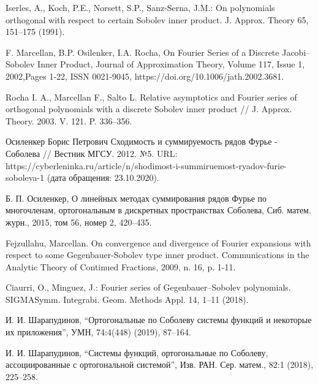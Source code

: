 \begin{thebibliography}{111}
	
	
	
	
	Iserles, A., Koch, P.E., Norsett, S.P., Sanz-Serna, J.M.: On polynomials orthogonal with respect to
	certain Sobolev inner product. J. Approx. Theory 65, 151–175 (1991).
	
	
	
	
	F. Marcellan, B.P. Osilenker, I.A. Rocha, On Fourier Series of a Discrete Jacobi–Sobolev Inner Product, Journal of Approximation Theory, Volume 117, Issue 1, 2002,Pages 1-22, ISSN 0021-9045, https://doi.org/10.1006/jath.2002.3681.
	
	
	
	
	Rocha I. A., Marcellan F., Salto L. Relative asymptotics and Fourier series of orthogonal
	polynomials with a discrete Sobolev inner product // J. Approx. Theory. 2003. V. 121.
	P. 336–356.
	
	
	
	
	Осиленкер Борис Петрович Сходимость и суммируемость рядов Фурье - Соболева // Вестник МГСУ. 2012. №5. URL: https://cyberleninka.ru/article/n/shodimost-i-summiruemost-ryadov-furie-soboleva-1 (дата обращения: 23.10.2020).
	
	
	
	
	Б. П. Осиленкер, О линейных методах суммирования рядов Фурье по многочленам, ортогональным в дискретных пространствах Соболева, Сиб. матем. журн., 2015, том 56, номер 2, 420–435.
	
	
	
	
	Fejzullahu, Marcellan. On convergence and divergence of Fourier expansions with respect to some Gegenbauer-Sobolev type inner product.
	Communications in the Analytic Theory of Continued Fractions, 2009, n. 16, p. 1-11.
	
	
	
	
	Ciaurri, O., Minguez, J.: Fourier series of Gegenbauer–Sobolev polynomials. SIGMASymm. Integrabi.
	Geom. Methods Appl. 14, 1–11 (2018).
	
	
	
	
	
	И. И. Шарапудинов, “Ортогональные по Соболеву системы функций и некоторые их приложения”, УМН, 74:4(448) (2019), 87–164.
	
	
	
	
	И. И. Шарапудинов, “Системы функций, ортогональные по Соболеву, ассоциированные с ортогональной системой”, Изв. РАН. Сер. матем., 82:1 (2018), 225–258.
	

\end{thebibliography}
